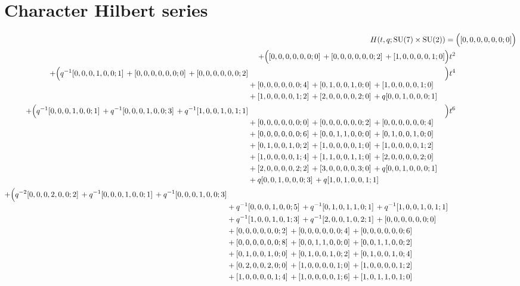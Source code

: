 \documentclass[10pt]{article}
\begin{document}
\section{Character Hilbert series}
\[
\begin{aligned}
H(t,q;\mathrm{SU}(7)\times\mathrm{SU}(2)) ={}&
   \Bigl([0,0,0,0,0,0;0]\Bigr) \\
  + \Bigl([0,0,0,0,0,0;0]\,+[0,0,0,0,0,0;2]\,+[1,0,0,0,0,1;0]\Bigr)t^{2} \\
  + \Bigl(\begin{aligned}[t]q^{-1}[0,0,0,1,0,0;1]\,+[0,0,0,0,0,0;0]\,+[0,0,0,0,0,0;2] \\
  &{}+[0,0,0,0,0,0;4]\,+[0,1,0,0,1,0;0]\,+[1,0,0,0,0,1;0] \\
  &{}+[1,0,0,0,0,1;2]\,+[2,0,0,0,0,2;0]\,+q[0,0,1,0,0,0;1]\end{aligned}\Bigr)t^{4} \\
  + \Bigl(\begin{aligned}[t]q^{-1}[0,0,0,1,0,0;1]\,+q^{-1}[0,0,0,1,0,0;3]\,+q^{-1}[1,0,0,1,0,1;1] \\
  &{}+[0,0,0,0,0,0;0]\,+[0,0,0,0,0,0;2]\,+[0,0,0,0,0,0;4] \\
  &{}+[0,0,0,0,0,0;6]\,+[0,0,1,1,0,0;0]\,+[0,1,0,0,1,0;0] \\
  &{}+[0,1,0,0,1,0;2]\,+[1,0,0,0,0,1;0]\,+[1,0,0,0,0,1;2] \\
  &{}+[1,0,0,0,0,1;4]\,+[1,1,0,0,1,1;0]\,+[2,0,0,0,0,2;0] \\
  &{}+[2,0,0,0,0,2;2]\,+[3,0,0,0,0,3;0]\,+q[0,0,1,0,0,0;1] \\
  &{}+q[0,0,1,0,0,0;3]\,+q[1,0,1,0,0,1;1]\end{aligned}\Bigr)t^{6} \\
  + \Bigl(\begin{aligned}[t]q^{-2}[0,0,0,2,0,0;2]\,+q^{-1}[0,0,0,1,0,0;1]\,+q^{-1}[0,0,0,1,0,0;3] \\
  &{}+q^{-1}[0,0,0,1,0,0;5]\,+q^{-1}[0,1,0,1,1,0;1]\,+q^{-1}[1,0,0,1,0,1;1] \\
  &{}+q^{-1}[1,0,0,1,0,1;3]\,+q^{-1}[2,0,0,1,0,2;1]\,+[0,0,0,0,0,0;0] \\
  &{}+[0,0,0,0,0,0;2]\,+[0,0,0,0,0,0;4]\,+[0,0,0,0,0,0;6] \\
  &{}+[0,0,0,0,0,0;8]\,+[0,0,1,1,0,0;0]\,+[0,0,1,1,0,0;2] \\
  &{}+[0,1,0,0,1,0;0]\,+[0,1,0,0,1,0;2]\,+[0,1,0,0,1,0;4] \\
  &{}+[0,2,0,0,2,0;0]\,+[1,0,0,0,0,1;0]\,+[1,0,0,0,0,1;2] \\
  &{}+[1,0,0,0,0,1;4]\,+[1,0,0,0,0,1;6]\,+[1,0,1,1,0,1;0] \\

\end{aligned}
\end{aligned}\]
\end{document}
